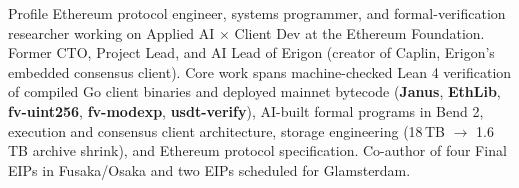 \documentclass[10pt]{resume}
\begin{document}

\begin{rSection}{Profile}
Ethereum protocol engineer, systems programmer, and formal-verification researcher working on Applied AI $\times$ Client Dev at the Ethereum Foundation. Former CTO, Project Lead, and AI Lead of Erigon (creator of Caplin, Erigon's embedded consensus client). Core work spans machine-checked Lean 4 verification of compiled Go client binaries and deployed mainnet bytecode (\textbf{Janus}, \textbf{EthLib}, \textbf{fv-uint256}, \textbf{fv-modexp}, \textbf{usdt-verify}), AI-built formal programs in Bend 2, execution and consensus client architecture, storage engineering (18\,TB $\to$ 1.6\,TB archive shrink), and Ethereum protocol specification. Co-author of four Final EIPs in Fusaka/Osaka and two EIPs scheduled for Glamsterdam.
\end{rSection}

\end{document}
